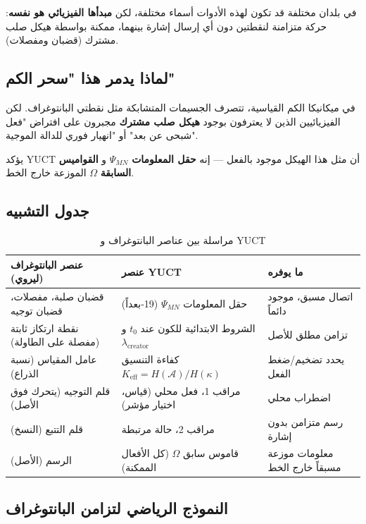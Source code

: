 \documentclass[11pt,a4paper]{article}
\begin{document}
	في بلدان مختلفة قد تكون لهذه الأدوات أسماء مختلفة، لكن \textbf{مبدأها الفيزيائي هو نفسه}: حركة متزامنة لنقطتين دون أي إرسال إشارة بينهما، ممكنة بواسطة هيكل صلب مشترك (قضبان ومفصلات).
	
	\subsection{لماذا يدمر هذا "سحر الكم"}
	
	في ميكانيكا الكم القياسية، تتصرف الجسيمات المتشابكة مثل نقطتي البانتوغراف. لكن الفيزيائيين الذين لا يعترفون بوجود \textbf{هيكل صلب مشترك} مجبرون على افتراض "فعل شبحى عن بعد" أو "انهيار فوري للدالة الموجية".
	
	يؤكد YUCT أن مثل هذا الهيكل موجود بالفعل — إنه \textbf{حقل المعلومات} \(\Psi_{MN}\) و \textbf{القواميس السابقة} \(\Omega\) الموزعة خارج الخط.
	
	\subsection{جدول التشبيه}
	
	\begin{table}[htbp]
		\centering
		\caption{مراسلة بين عناصر البانتوغراف و YUCT}
		\label{tab:pantograf}
		\begin{tabular}{|p{3.5cm}|p{3.5cm}|p{5.5cm}|}
			\hline
			\textbf{عنصر البانتوغراف (ليروي)} & \textbf{عنصر YUCT} & \textbf{ما يوفره} \\
			\hline
			قضبان صلبة، مفصلات، قضبان توجيه & حقل المعلومات \(\Psi_{MN}\) (19‑بعداً) & اتصال مسبق، موجود دائماً \\
			\hline
			نقطة ارتكاز ثابتة (مفصلة على الطاولة) & الشروط الابتدائية للكون عند \(t_0\) و \(\lambda_{\mathrm{creator}}\) & تزامن مطلق للأصل \\
			\hline
			عامل المقياس (نسبة الذراع) & كفاءة التنسيق \(K_{\mathrm{eff}} = H(\mathcal{A})/H(\kappa)\) & يحدد تضخيم/ضغط الفعل \\
			\hline
			قلم التوجيه (يتحرك فوق الأصل) & مراقب 1، فعل محلي (قياس، اختيار مؤشر) & اضطراب محلي \\
			\hline
			قلم التتبع (النسخ) & مراقب 2، حالة مرتبطة & رسم متزامن بدون إشارة \\
			\hline
			الرسم (الأصل) & قاموس سابق \(\Omega\) (كل الأفعال الممكنة) & معلومات موزعة مسبقاً خارج الخط \\
			\hline
		\end{tabular}
	\end{table}
	
	\subsection{النموذج الرياضي لتزامن البانتوغراف}
	
\end{document}
